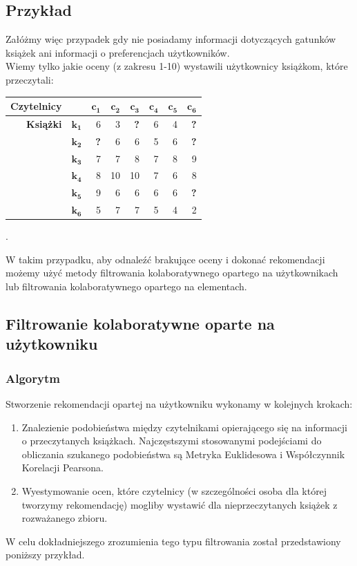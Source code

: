 \documentclass[12pt,a4paper]{report}
\begin{document}
\subsection{Przykład}
Załóżmy więc przypadek gdy nie posiadamy informacji dotyczących gatunków książek ani informacji o preferencjach użytkowników.
\\Wiemy tylko jakie oceny (z zakresu 1-10) wystawili użytkownicy książkom, które przeczytali:
\begin{center}
\begin{tabular}{|r|r|r|r|r|r|r|r|} \hline
\textbf{Czytelnicy} & & $\mathbf{c_1}$ & $\mathbf{c_2}$ & $\mathbf{c_3}$ & $\mathbf{c_4}$ & $\mathbf{c_5}$ & $\mathbf{c_6}$\\
\hline
\hline
\textbf{Książki} &$\mathbf{k_1}$ & 6 & 3 & \textbf{?} & 6 & 4 & \textbf{?}\\
\hline
&$\mathbf{k_2}$ & \textbf{?} & 6 & 6 & 5 & 6 & \textbf{?}\\
\hline
&$\mathbf{k_3}$ & 7 & 7 & 8 & 7 & 8 & 9 \\
\hline
&$\mathbf{k_4}$ & 8 & 10 & 10 & 7 & 6 & 8\\
\hline
&$\mathbf{k_5}$ & 9 & 6 & 6 & 6 & 6 & \textbf{?} \\
\hline
&$\mathbf{k_6}$ & 5 & 7 & 7 & 5 & 4 & 2\\
\hline
\end{tabular}.
\end{center}
W takim przypadku, aby odnaleźć brakujące oceny i dokonać rekomendacji możemy użyć metody filtrowania kolaboratywnego opartego na użytkownikach lub filtrowania kolaboratywnego opartego na elementach.

\subsection{Filtrowanie kolaboratywne oparte na użytkowniku}

\subsubsection{Algorytm}
Stworzenie rekomendacji opartej na użytkowniku wykonamy w kolejnych krokach:
\begin{enumerate}
\item Znalezienie podobieństwa między czytelnikami opierającego się na informacji o przeczytanych książkach. Najczęstszymi stosowanymi podejściami do obliczania szukanego podobieństwa są Metryka Euklidesowa i Współczynnik Korelacji Pearsona.
\item Wyestymowanie ocen, które czytelnicy (w szczególności osoba dla której tworzymy rekomendację) mogliby wystawić dla nieprzeczytanych książek z rozważanego zbioru.
\end{enumerate}
W celu dokładniejszego zrozumienia tego typu filtrowania został przedstawiony poniższy przykład.
\end{document}
